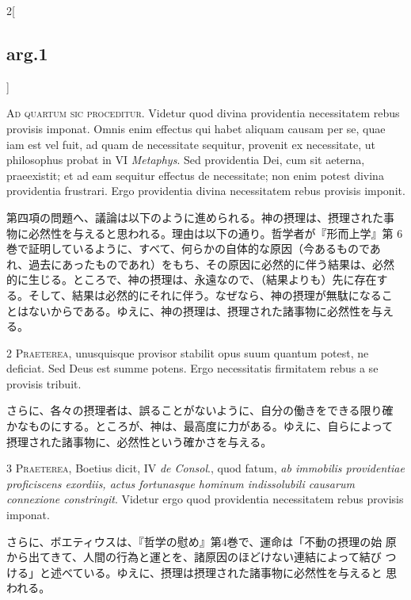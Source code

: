 \documentclass[paper=a4paper,fontsize=10pt,jafontsize=9pt,titlepage]{jlreq}
\begin{document}
\begin{paracol}{2}[\subsection{arg.1}]

{\Huge A}{\scshape d quartum sic proceditur}. Videtur quod
divina providentia necessitatem rebus provisis imponat. Omnis enim
effectus qui habet aliquam causam per se, quae iam est vel fuit, ad quam
de necessitate sequitur, provenit ex necessitate, ut philosophus probat
in VI {\itshape Metaphys}. Sed providentia Dei, cum sit aeterna, praeexistit; et ad
eam sequitur effectus de necessitate; non enim potest divina providentia
frustrari. Ergo providentia divina necessitatem rebus provisis imponit.

\switchcolumn

第四項の問題へ、議論は以下のように進められる。神の摂理は、摂理された事
物に必然性を与えると思われる。理由は以下の通り。哲学者が『形而上学』第
6巻で証明しているように、すべて、何らかの自体的な原因（今あるものであ
れ、過去にあったものであれ）をもち、その原因に必然的に伴う結果は、必然
的に生じる。ところで、神の摂理は、永遠なので、（結果よりも）先に存在す
る。そして、結果は必然的にそれに伴う。なぜなら、神の摂理が無駄になるこ
とはないからである。ゆえに、神の摂理は、摂理された諸事物に必然性を与え
る。

\switchcolumn*

2 {\scshape Praeterea}, unusquisque provisor stabilit
opus suum quantum potest, ne deficiat. Sed Deus est summe potens. Ergo
necessitatis firmitatem rebus a se provisis tribuit.

\switchcolumn

さらに、各々の摂理者は、誤ることがないように、自分の働きをできる限り確
かなものにする。ところが、神は、最高度に力がある。ゆえに、自らによって
摂理された諸事物に、必然性という確かさを与える。

\switchcolumn*

3 {\scshape Praeterea}, Boetius dicit, IV {\itshape de Consol}.,
quod fatum, {\itshape ab immobilis providentiae proficiscens exordiis, actus
fortunasque hominum indissolubili causarum connexione
constringit}. Videtur ergo quod providentia necessitatem rebus provisis
imponat.

\switchcolumn

さらに、ボエティウスは、『哲学の慰め』第4巻で、運命は「不動の摂理の始
原から出てきて、人間の行為と運とを、諸原因のほどけない連結によって結び
つける」と述べている。ゆえに、摂理は摂理された諸事物に必然性を与えると
思われる。


\end{paracol}
\end{document}
